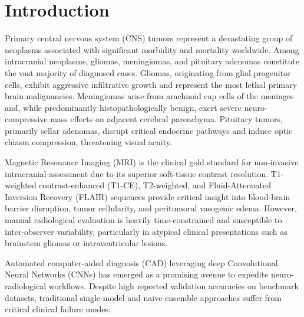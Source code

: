 \documentclass[runningheads]{llncs}
\begin{document}
\section{Introduction}
Primary central nervous system (CNS) tumors represent a devastating group of neoplasms associated with significant morbidity and mortality worldwide. Among intracranial neoplasms, gliomas, meningiomas, and pituitary adenomas constitute the vast majority of diagnosed cases. Gliomas, originating from glial progenitor cells, exhibit aggressive infiltrative growth and represent the most lethal primary brain malignancies. Meningiomas arise from arachnoid cap cells of the meninges and, while predominantly histopathologically benign, exert severe neuro-compressive mass effects on adjacent cerebral parenchyma. Pituitary tumors, primarily sellar adenomas, disrupt critical endocrine pathways and induce optic chiasm compression, threatening visual acuity.

Magnetic Resonance Imaging (MRI) is the clinical gold standard for non-invasive intracranial assessment due to its superior soft-tissue contrast resolution. T1-weighted contrast-enhanced (T1-CE), T2-weighted, and Fluid-Attenuated Inversion Recovery (FLAIR) sequences provide critical insight into blood-brain barrier disruption, tumor cellularity, and peritumoral vasogenic edema. However, manual radiological evaluation is heavily time-constrained and susceptible to inter-observer variability, particularly in atypical clinical presentations such as brainstem gliomas or intraventricular lesions.

Automated computer-aided diagnosis (CAD) leveraging deep Convolutional Neural Networks (CNNs) has emerged as a promising avenue to expedite neuro-radiological workflows. Despite high reported validation accuracies on benchmark datasets, traditional single-model and naive ensemble approaches suffer from critical clinical failure modes:
\end{document}
